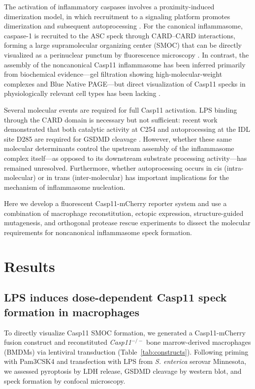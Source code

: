 \documentclass[11pt,a4paper]{article}
\begin{document}
The activation of inflammatory caspases involves a proximity-induced dimerization model, in which recruitment to a signaling platform promotes dimerization and subsequent autoprocessing \citep{Salvesen2009, Boucher2018}. For the canonical inflammasome, caspase-1 is recruited to the ASC speck through CARD--CARD interactions, forming a large supramolecular organizing center (SMOC) that can be directly visualized as a perinuclear punctum by fluorescence microscopy \citep{Lu2014, Dick2016, Stutz2017}. In contrast, the assembly of the noncanonical Casp11 inflammasome has been inferred primarily from biochemical evidence---gel filtration showing high-molecular-weight complexes and Blue Native PAGE---but direct visualization of Casp11 specks in physiologically relevant cell types has been lacking \citep{Lee2018, Ross2018}.

Several molecular events are required for full Casp11 activation. LPS binding through the CARD domain is necessary but not sufficient: recent work demonstrated that both catalytic activity at C254 and autoprocessing at the IDL site D285 are required for GSDMD cleavage \citep{Lee2018, Ross2018, Broz2020}. However, whether these same molecular determinants control the upstream assembly of the inflammasome complex itself---as opposed to its downstream substrate processing activity---has remained unresolved. Furthermore, whether autoprocessing occurs in cis (intra-molecular) or in trans (inter-molecular) has important implications for the mechanism of inflammasome nucleation.

Here we develop a fluorescent Casp11-mCherry reporter system and use a combination of macrophage reconstitution, ectopic expression, structure-guided mutagenesis, and orthogonal protease rescue experiments to dissect the molecular requirements for noncanonical inflammasome speck formation.

\section{Results}

\subsection{LPS induces dose-dependent Casp11 speck formation in macrophages}

To directly visualize Casp11 SMOC formation, we generated a Casp11-mCherry fusion construct and reconstituted \textit{Casp11$^{-/-}$} bone marrow-derived macrophages (BMDMs) via lentiviral transduction (Table~\ref{tab:constructs}). Following priming with Pam3CSK4 and transfection with LPS from \textit{S. enterica} serovar Minnesota, we assessed pyroptosis by LDH release, GSDMD cleavage by western blot, and speck formation by confocal microscopy.
\end{document}
